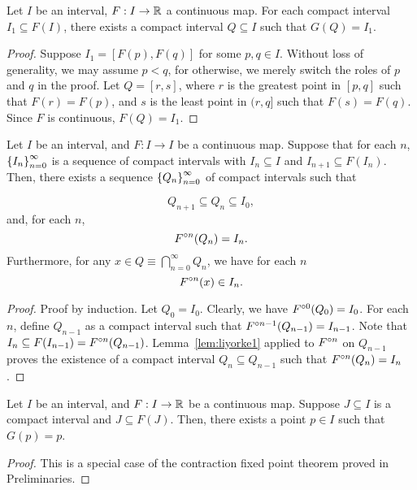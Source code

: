 \documentclass[12pt,draft,twoside]{book}
\begin{document}
\begin{lemma}
  Let $I$ be an interval, $F: I \to \mathbb{R}$ a continuous map.
  For each compact interval $I_1 \subseteq F(I)$, there exists a compact interval $Q \subseteq I$ such that $G(Q) = I_1$.
  \label{lem:liyorke1}
  \begin{proof}
    Suppose $I_1 = [F(p),F(q)]$ for some $p,q \in I$.
    Without loss of generality, we may assume $p < q$, for otherwise, we merely switch the roles of $p$ and $q$ in the proof.
    Let $Q = [r,s]$, where $r$ is the greatest point in $[p,q]$ such that $F(r) = F(p)$, and $s$ is the least point in $(r,q]$ such that $F(s) = F(q)$.
    Since $F$ is continuous, $F(Q) = I_1$.
  \end{proof}
\end{lemma}

\begin{lemma}
  Let $I$ be an interval, and $F: I\to I$ be a continuous map.
  Suppose that for each $n$, $\left \{ I_n \right \}^{\infty}_{n=0}$ is a sequence of compact intervals with $I_n \subseteq I$ and $I_{n+1} \subseteq F(I_n)$.
  Then, there exists a sequence $\left \{ Q_n \right \}^{\infty}_{n=0}$ of compact intervals such that 
  

\begin{equation*}
    Q_{n+1} \subseteq Q_{n} \subseteq I_0,
  \end{equation*}
and, for each $n$,
  \begin{equation*}
    F^{\circ n}(Q_n) = I_n.
  \end{equation*}
  Furthermore, for any $x \in Q \equiv \bigcap\limits_{n=0}^{\infty}Q_n$, we have for each $n$
  \begin{equation*}
    F^{\circ n}(x) \in I_n.
  \end{equation*}
  \label{lem:liyorke2}
  \begin{proof}
    Proof by induction.
    Let $Q_0 = I_0$.
    Clearly, we have $F^{\circ 0}(Q_0) = I_0$.
    For each $n$, define $Q_{n-1}$ as a compact interval such that $F^{\circ n-1}(Q_{n-1}) = I_{n-1}$.
    Note that $I_n \subseteq F(I_{n-1}) = F^{\circ n}(Q_{n-1})$.
    Lemma~\ref{lem:liyorke1} applied to $F^{\circ n}$ on $Q_{n-1}$ proves the existence of a compact interval $Q_n \subseteq Q_{n-1}$ such that $F^{\circ n}(Q_n) = I_n$.
  \end{proof}
\end{lemma}

\begin{lemma}
  Let $I$ be an interval, and $F: I\to \mathbb{R}$ be a continuous map.
  Suppose $J \subseteq I$ is a compact interval and $J \subseteq F(J)$. 
  Then, there exists a point $p \in I$ such that $G(p) = p$.
  \begin{proof}
    This is a special case of the contraction fixed point theorem proved in Preliminaries.
  \end{proof}
  \label{lem:liyorke3}
\end{lemma}
\end{document}
